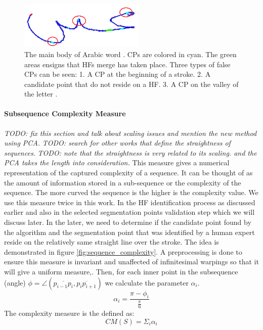 \documentclass[journal,compsoc]{IEEEtran}
\begin{document}
\begin{figure}
\centering
\includegraphics[width=6cm]{./figures/candidate_in_no_horizontal}
\caption{The main body of Arabic word . CPs are colored in cyan. The green areas ensigns that HFs merge has taken place. Three types of false CPs can be seen: 1. A CP at the beginning of a stroke. 2. A candidate point that do not reside on a HF. 3. A CP on the valley of the letter . }
\label{fig:candidate_in_no_horizontal}
\end{figure}

\paragraph{Subsequence Complexity Measure}
\label{par:scm}
\emph{TODO: fix this section and talk about scaling issues and mention the new method using PCA.}
\emph{TODO: search for other works that define the straightness of sequences.}
\emph{TODO: note that the straightness is very related to its scaling. and the PCA takes the length into consideration.}
This measure gives a numerical representation of the captured complexity of a sequence. It can be thought of as the amount of information stored in a sub-sequence or the complexity of the sequence. The more curved the sequence is the higher is the complexity value. We use this measure twice in this work. In the HF identification process as discussed earlier and also in the selected segmentation points validation step which we will discuss later. In the later, we need to determine if the candidate point found by the algorithm and the segmentation point that was identified by a human expert reside on the relatively same straight line over the stroke. The idea is demonstrated in figure \ref{fig:sequence_complexity}.
A preprocessing is done to ensure this measure is invariant and unaffected of infinitesimal warpings so that it will give a uniform measure,. 
Then, for each inner point in the subsequence (angle) $\phi=\angle(\overline{p_{i-1}p_{i}},\overline{p_{i}p_{i+1}})$ we calculate the parameter $\alpha_{i}$.
\begin{equation}
 \alpha_{i}=\frac{\pi-\phi_{i}}{\frac{\pi}{6}}
\end{equation}
The complexity measure is the defined as:
\begin{equation}
CM(S)=\Sigma_{i}\alpha_{i}
\end{equation}
\end{document}
